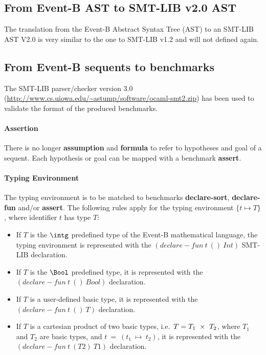 \subsection{From Event-B AST to SMT-LIB v2.0 AST}
The translation from the Event-B Abstract Syntax Tree (AST) to an SMT-LIB AST V2.0 is very similar to the one to SMT-LIB v1.2 and will not defined again.

\subsection{From Event-B sequents to benchmarks}
The SMT-LIB parser/checker version 3.0 (\url{http://www.cs.uiowa.edu/~astump/software/ocaml-smt2.zip}) has been used to validate the format of the produced benchmarks.

\paragraph{Assertion}
There is no longer \textbf{assumption} and \textbf{formula} to refer to hypotheses and goal of a sequent. Each hypothesis or goal can be mapped with a benchmark \textbf{assert}. 

\paragraph{Typing Environment}
The typing environment is to be matched to benchmarks \textbf{declare-sort},  \textbf{declare-fun} and/or \textbf{assert}. The following rules apply for the typing environment $\{t \mapsto T\}$, where identifier $t$ has type $T$:
\begin{itemize}
\item If $T$ is the $\intg$ predefined type of the Event-B 
mathematical language, the typing environment is represented 
with the $(declare-fun~t~()~Int)$  SMT-LIB declaration.
\item If $T$ is the $\Bool$ predefined type, it is
represented with the $(declare-fun~t~()~Bool)$  declaration.
\item If $T$ is a user-defined basic type, it is represented
with the $(declare-fun~t~()~T)$ declaration.
\item If $T$ is a cartesian product of two basic types, i.e.\
$T = T_1~\mathbin\times~T_2$, where $T_1$ and $T_2$ are basic types,
and $t~=~(t_1~\mapsto~t_2)$, it is represented with the 
$(declare-fun~t~(T2)~T1)$ declaration.
\end{itemize}

